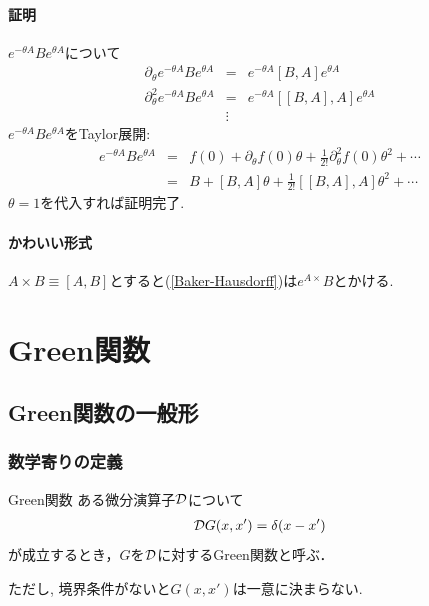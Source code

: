 \documentclass[10.5pt,a4paper]{jreport}
\begin{document}
\subsubsection{証明}
$e^{-\theta A}Be^{\theta A}$について
\begin{eqnarray}
  \partial_\theta e^{-\theta A}Be^{\theta A} &=& e^{-\theta A}[B, A]e^{\theta A}\\
  \partial_\theta^2 e^{-\theta A}Be^{\theta A} &=& e^{-\theta A}[[B, A], A]e^{\theta A}\\
  \nonumber&\vdots&
\end{eqnarray}
$e^{-\theta A}Be^{\theta A}$をTaylor展開:
\begin{eqnarray}
  e^{-\theta A}Be^{\theta A} &=& f(0) + \partial_\theta f(0)\theta + \frac{1}{2!}\partial^2_\theta f(0)\theta^2 + \cdots\\
  &=& B + [B, A]\theta + \frac{1}{2!}[[B, A], A]\theta^2 + \cdots\label{Baker-Hausdorff}
\end{eqnarray}
$\theta = 1$を代入すれば証明完了.
\subsubsection{かわいい形式}
$A\times B\equiv [A, B]$とすると(\ref{Baker-Hausdorff})は$e^{A\times}B$とかける. 
\newpage
\chapter{Green関数}
\section{Green関数の一般形}
\subsection{数学寄りの定義}
\begin{itembox}[c]{Green関数}
  ある微分演算子${\cal D}$について
  \begin{eqnarray}
    {\cal D}G(x, x') = \delta(x-x')
  \end{eqnarray}
  が成立するとき，$G$を${\cal D}$に対するGreen関数と呼ぶ．
\end{itembox}
ただし, 境界条件がないと$G(x, x')$は一意に決まらない.
\end{document}
